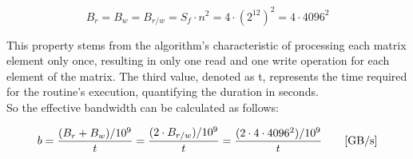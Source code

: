 \documentclass{article}
\begin{document}
\begin{equation}
    B_r = B_w = B_{r/w} = S_f \cdot n^2 = 4 \cdot (2^{12})^2 = 4 \cdot 4096^2
\end{equation}

This property stems from the algorithm's characteristic of processing each matrix element only once, resulting in only one read and one write operation for each element of the matrix.
The third value, denoted as t, represents the time required for the routine's execution, quantifying the duration in seconds.\\
So the effective bandwidth can be calculated as follows:

\begin{equation}
    b=\frac{(B_r+B_w)/10^9}{t}=\frac{(2 \cdot B_{r/w})/10^9}{t}=\frac{(2 \cdot 4 \cdot 4096^2)/10^9}{t}\qquad[\textnormal{GB/s}]
\end{equation}
\end{document}

